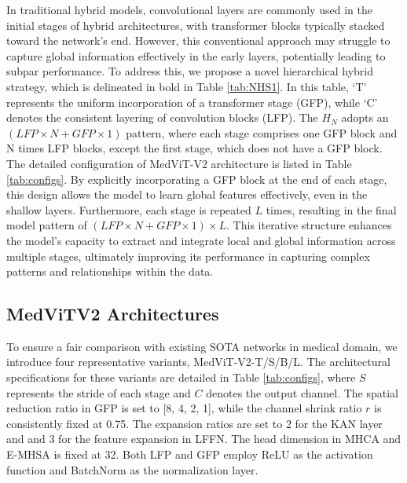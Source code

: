 \documentclass[times,twocolumn,final]{elsarticle}
\begin{document}
In traditional hybrid models, convolutional layers are commonly used in the initial stages of hybrid architectures, with transformer blocks typically stacked toward the network's end. However, this conventional approach may struggle to capture global information effectively in the early layers, potentially leading to subpar performance. To address this, we propose a novel hierarchical hybrid strategy, which is delineated in bold in Table \ref{tab:NHS1}. In this table, `T' represents the uniform incorporation of a transformer stage (GFP), while `C' denotes the consistent layering of convolution blocks (LFP). The $H_N$ adopts an $(LFP\times N+GFP \times1)$ pattern, where each stage comprises one GFP block and N times LFP blocks, except the first stage, which does not have a GFP block. The detailed configuration of MedViT-V2 architecture is listed in Table \ref{tab:configs}. By explicitly incorporating a GFP block at the end of each stage, this design allows the model to learn global features effectively, even in the shallow layers. Furthermore, each stage is repeated $L$ times, resulting in the final model pattern of $(LFP\times N + GFP\times 1) \times L$. This iterative structure enhances the model's capacity to extract and integrate local and global information across multiple stages, ultimately improving its performance in capturing complex patterns and relationships within the data.


\subsection{MedViTV2 Architectures}

To ensure a fair comparison with existing SOTA networks in medical domain, we introduce four representative variants, MedViT-V2-T/S/B/L. The architectural specifications for these variants are detailed in Table \ref{tab:configs}, where $S$ represents the stride of each stage and $C$ denotes the output channel.
The spatial reduction ratio in GFP is set to [8, 4, 2, 1], while the channel shrink ratio $r$ is consistently fixed at 0.75.
The expansion ratios are set to 2 for the KAN layer and and 3 for the feature expansion in LFFN. The head dimension in MHCA and E-MHSA is fixed at 32. Both LFP and GFP employ ReLU as the activation function and BatchNorm as the normalization layer.
\end{document}
